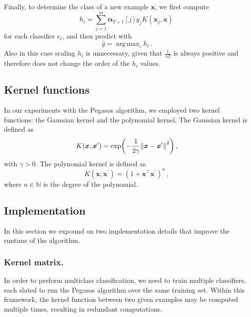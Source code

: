 \documentclass[runningheads]{llncs}
\DeclareMathOperator*{\argmax}{arg\,max}
\begin{document}
Finally, to determine the class of a new example $\bm{x}$, we first compute
\begin{equation}
  h_i = \sum_{j = 1}^{m} \bm{\alpha}_{T+1}[j] y_j K(\bm{x}_j, \bm{x}) \,
  \label{eqn:pegasos:h_i}
\end{equation}
for each classifier $c_i$, and then predict with
\[
  \hat{y} = \argmax_i {h_i} \, .
\]
Also in this case scaling $h_i$ is unnecessary, given that $\frac{1}{\lambda T}$ is always positive and therefore does not change the order of the $h_i$ values.


\subsection{Kernel functions}
\label{subsec:algorithm:kernel}

In our experiments with the Pegasos algorithm, we employed two kernel functions: the Gaussian kernel and the polynomial kernel. The Gaussian kernel is defined as
\begin{equation}
  K(\bm{x},\bm{x}^\prime) = \exp(-\frac{1}{2 \gamma}\norm{\bm{x} - \bm{x}^\prime}^2) \, , \label{eqn:kernel:gaussian}
\end{equation}
with $\gamma > 0$. The polynomial kernel is defined as
\begin{equation}
  K(\bm{x},\bm{x}^\prime) = (1 + \bm{x}^\top \bm{x}^\prime)^n \, , \label{eqn:kernel:polynomial} 
\end{equation}
where $n \in \mathbb{N}$ is the degree of the polynomial. 

\subsection{Implementation}
\label{subsec:algorithm:implementation}

In this section we expound on two implementation details that improve the runtime of the algorithm.

\subsubsection{Kernel matrix.} In order to perform multiclass classification, we need to train multiple classifiers, each slated to run the Pegasos algorithm over the same training set. Within this framework, the kernel function between two given examples may be computed multiple times, resulting in redundant computations.
\end{document}
